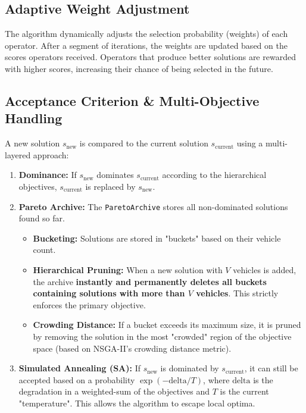 \documentclass[a4paper,12pt]{article}
\begin{document}
\subsection{Adaptive Weight Adjustment}
The algorithm dynamically adjusts the selection probability (weights) of each operator. After a segment of iterations, the weights are updated based on the scores operators received. Operators that produce better solutions are rewarded with higher scores, increasing their chance of being selected in the future.

\subsection{Acceptance Criterion & Multi-Objective Handling}
A new solution $s_{\text{new}}$ is compared to the current solution $s_{\text{current}}$ using a multi-layered approach:
\begin{enumerate}
    \item \textbf{Dominance:} If $s_{\text{new}}$ dominates $s_{\text{current}}$ according to the hierarchical objectives, $s_{\text{current}}$ is replaced by $s_{\text{new}}$.
    \item \textbf{Pareto Archive:} The \texttt{ParetoArchive} stores all non-dominated solutions found so far.
    \begin{itemize}
        \item \textbf{Bucketing:} Solutions are stored in "buckets" based on their vehicle count.
        \item \textbf{Hierarchical Pruning:} When a new solution with $V$ vehicles is added, the archive \textbf{instantly and permanently deletes all buckets containing solutions with more than $V$ vehicles}. This strictly enforces the primary objective.
        \item \textbf{Crowding Distance:} If a bucket exceeds its maximum size, it is pruned by removing the solution in the most "crowded" region of the objective space (based on NSGA-II's crowding distance metric).
    \end{itemize}
    \item \textbf{Simulated Annealing (SA):} If $s_{\text{new}}$ is dominated by $s_{\text{current}}$, it can still be accepted based on a probability $\exp(-\text{delta} / T)$, where $\text{delta}$ is the degradation in a weighted-sum of the objectives and $T$ is the current "temperature". This allows the algorithm to escape local optima.
\end{enumerate}
\end{document}
